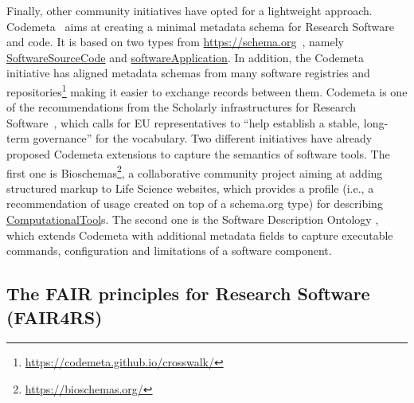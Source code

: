 Finally, other community initiatives have opted for a lightweight approach. Codemeta~\cite{Boettigeral2017} aims at creating a minimal metadata schema for Research Software and code. It is based on two types from \url{https://schema.org}~\cite{guha_schemaorg_2016}, namely \href{https://schema.org/SoftwareSourceCode}{SoftwareSourceCode} and \href{https://schema.org/SoftwareApplication}{softwareApplication}. In addition, the Codemeta initiative has aligned metadata schemas from many software registries and repositories\footnote{\url{https://codemeta.github.io/crosswalk/}} making it easier to exchange records between them. Codemeta is one of the recommendations from the Scholarly infrastructures for Research Software~\cite{sirs_2019}, which calls for EU representatives to ``help establish a stable, long-term governance'' for the vocabulary. Two different initiatives have already proposed Codemeta extensions to capture the semantics of software tools. The first one is Bioschemas\footnote{\url{https://bioschemas.org/}}, a collaborative community project aiming at adding structured markup to Life Science websites, which provides a profile (i.e., a recommendation of usage created on top of a schema.org type) for describing \href{https://bioschemas.org/profiles/ComputationalTool}{ComputationalTool}s. The second one is the Software Description Ontology \cite{garijo2019okg}, which extends Codemeta with additional metadata fields to capture executable commands, configuration and limitations of a software component. 


\subsection{The FAIR principles for Research Software (FAIR4RS)}
\label{subsec:fair4rs}



